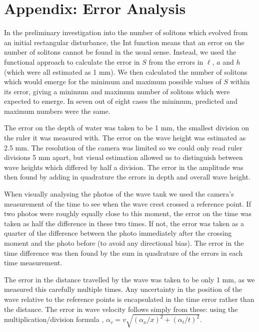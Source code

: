 \documentclass[10pt, twocolumn]{revtex4}    %
\begin{document}

\section{Appendix: Error Analysis} \label{Errors}

In the preliminary investigation into the number of solitons which evolved from an initial rectangular disturbance, the Int function means that an error on the number of solitons cannot be found in the usual sense. Instead, we used the functional approach \cite{Hughes} to calculate the error in $S$ from the errors in $\ell$, $a$ and $h$ (which were all estimated as 1 mm). We then calculated the number of solitons which would emerge for the minimum and maximum possible values of $S$ within its error, giving a minimum and maximum number of solitons which were expected to emerge. In seven out of eight cases the minimum, predicted and maximum numbers were the same. 

The error on the depth of water was taken to be 1 mm, the smallest division on the ruler it was measured with. The error on the wave height was estimated as 2.5 mm. The resolution of the camera was limited so we could only read ruler divisions 5 mm apart, but visual estimation allowed us to distinguish between wave heights which differed by half a division. The error in the amplitude was then found by adding in quadrature the errors in depth and overall wave height. 

When visually analysing the photos of the wave tank we used the camera's measurement of the time to see when the wave crest crossed a reference point. If two photos were roughly equally close to this moment, the error on the time was taken as half the difference in these two times. If not, the error was taken as a quarter of the difference between the photo immediately after the crossing moment and the photo before (to avoid any directional bias). The error in the time difference was then found by the sum in quadrature of the errors in each time measurement. 

The error in the distance travelled by the wave was taken to be only 1 mm, as we measured this carefully multiple times. Any uncertainty in the position of the wave relative to the reference points is encapsulated in the time error rather than the distance. The error in wave velocity follows simply from these: using the multiplication/division formula \cite{Hughes}, $\alpha_v = v \sqrt{(\alpha_x/x)^2 + (\alpha_t/t)^2}$. 
\end{document}
